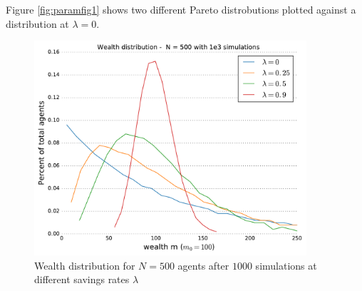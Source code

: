 \documentclass[10pt, a4paper]{amsart}
\begin{document}
Figure \ref{fig:paramfig1} shows two different Pareto distrobutions plotted against a distribution at $\lambda = 0$.


\begin{figure}
	\centering
	\includegraphics[width=0.9\textwidth]{../figures/5ac/5c_N500_varSavings.pdf}
	\caption{Wealth distribution for $N=500$ agents after $1000$ simulations at different savings rates $\lambda$}
	\label{fig:distribution}
\end{figure}
\end{document}

